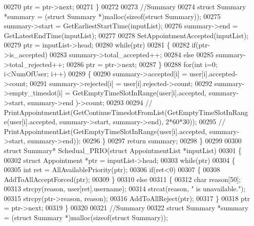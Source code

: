 \begin{DoxyCode}
00270         ptr = ptr->next;
00271     \}
00272 
00273     \textcolor{comment}{//Summary}
00274     \textcolor{keyword}{struct }Summary *summary = (\textcolor{keyword}{struct }Summary *)malloc(\textcolor{keyword}{sizeof}(\textcolor{keyword}{struct} Summary));
00275     summary->start = GetEarliestStartTime(inputList);
00276     summary->end = GetLatestEndTime(inputList);
00277     
00278     SetAppointmentAccepted(inputList);
00279     ptr = inputList->head;
00280     \textcolor{keywordflow}{while}(ptr)
00281     \{
00282         \textcolor{keywordflow}{if}(ptr->is\_accepted)
00283             summary->total\_accepted++;
00284         \textcolor{keywordflow}{else}
00285             summary->total\_rejected++;
00286         ptr = ptr->next;
00287     \}
00288     \textcolor{keywordflow}{for}(\textcolor{keywordtype}{int} i=0; i<NumOfUser; i++)
00289     \{
00290         summary->accepted[i] = user[i].accepted->count;
00291         summary->rejected[i] = user[i].rejected->count;
00292         summary->empty\_timeslot[i] = GetEmptyTimeSlotInRange(user[i].accepted, summary->start, summary->end
      )->count;
00293 
00294         \textcolor{comment}{// PrintAppointmentList(GetContinueTimeslotFromList(GetEmptyTimeSlotInRange(user[i].accepted,
       summary->start, summary->end), 2*60*30));}
00295         \textcolor{comment}{// PrintAppointmentList(GetEmptyTimeSlotInRange(user[i].accepted, summary->start, summary->end));}
00296     \}
00297     \textcolor{keywordflow}{return} summary;
00298 \}
00299 
00300 \textcolor{keyword}{struct }Summary* Schedual_PRIO(\textcolor{keyword}{struct} AppointmentList *inputList)
00301 \{
00302     \textcolor{keyword}{struct }Appointment *ptr = inputList->head;
00303     \textcolor{keywordflow}{while}(ptr)
00304     \{
00305         \textcolor{keywordtype}{int} ret = AllAvailablePriority(ptr);
00306         \textcolor{keywordflow}{if}(ret<0)
00307         \{
00308             AddToAllAcceptForced(ptr);
00309         \}
00310         \textcolor{keywordflow}{else}
00311         \{
00312             \textcolor{keywordtype}{char} reason[50];
00313             strcpy(reason, user[ret].username);
00314             strcat(reason, \textcolor{stringliteral}{" is unavailable."});
00315             strcpy(ptr->reason, reason);
00316             AddToAllReject(ptr);
00317         \}
00318         ptr = ptr->next;
00319     \}
00320 
00321     \textcolor{comment}{//Summary}
00322     \textcolor{keyword}{struct }Summary *summary = (\textcolor{keyword}{struct }Summary *)malloc(\textcolor{keyword}{sizeof}(\textcolor{keyword}{struct} Summary));

\end{DoxyCode}
